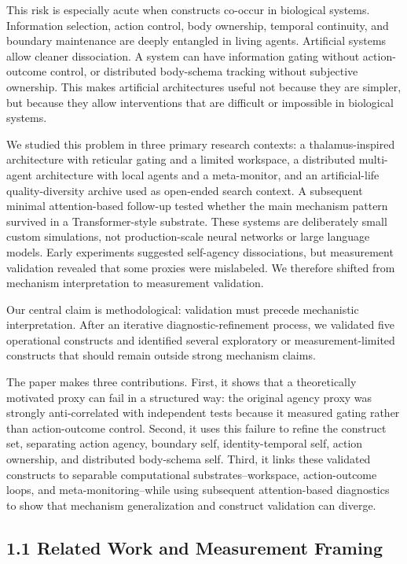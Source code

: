 \documentclass[
  11pt,
  letterpaper,
]{article}
\begin{document}
This risk is especially acute when constructs co-occur in biological
systems. Information selection, action control, body ownership, temporal
continuity, and boundary maintenance are deeply entangled in living
agents. Artificial systems allow cleaner dissociation. A system can have
information gating without action-outcome control, or distributed
body-schema tracking without subjective ownership. This makes artificial
architectures useful not because they are simpler, but because they
allow interventions that are difficult or impossible in biological
systems.

We studied this problem in three primary research contexts: a
thalamus-inspired architecture with reticular gating and a limited
workspace, a distributed multi-agent architecture with local agents and
a meta-monitor, and an artificial-life quality-diversity archive used as
open-ended search context. A subsequent minimal attention-based
follow-up tested whether the main mechanism pattern survived in a
Transformer-style substrate. These systems are deliberately small custom
simulations, not production-scale neural networks or large language
models. Early experiments suggested self-agency dissociations, but
measurement validation revealed that some proxies were mislabeled. We
therefore shifted from mechanism interpretation to measurement
validation.

Our central claim is methodological: validation must precede mechanistic
interpretation. After an iterative diagnostic-refinement process, we
validated five operational constructs and identified several exploratory
or measurement-limited constructs that should remain outside strong
mechanism claims.

The paper makes three contributions. First, it shows that a
theoretically motivated proxy can fail in a structured way: the original
agency proxy was strongly anti-correlated with independent tests because
it measured gating rather than action-outcome control. Second, it uses
this failure to refine the construct set, separating action agency,
boundary self, identity-temporal self, action ownership, and distributed
body-schema self. Third, it links these validated constructs to
separable computational substrates--workspace, action-outcome loops, and
meta-monitoring--while using subsequent attention-based diagnostics to
show that mechanism generalization and construct validation can diverge.

\subsection{1.1 Related Work and Measurement
Framing}\label{related-work-and-measurement-framing}
\end{document}
